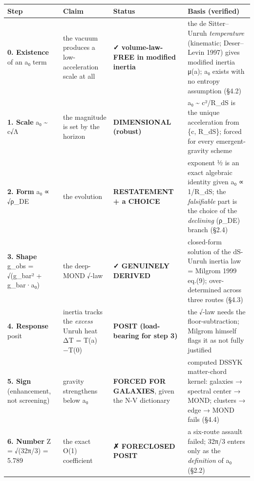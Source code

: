 \documentclass[
]{article}
\newcounter{none} %
\begin{document}
{\def\LTcaptype{none} %
\begin{longtable}[]{@{}
  >{\raggedright\arraybackslash}p{}
  >{\raggedright\arraybackslash}p{}
  >{\raggedright\arraybackslash}p{}
  >{\raggedright\arraybackslash}p{}@{}}
\toprule\noalign{}
\begin{minipage}[b]{\linewidth}\raggedright
Step
\end{minipage} & \begin{minipage}[b]{\linewidth}\raggedright
Claim
\end{minipage} & \begin{minipage}[b]{\linewidth}\raggedright
Status
\end{minipage} & \begin{minipage}[b]{\linewidth}\raggedright
Basis (verified)
\end{minipage} \\
\midrule\noalign{}
\endhead
\bottomrule\noalign{}
\endlastfoot
\textbf{0. Existence} of an a₀ term & the vacuum produces a
low-acceleration scale at all & \textbf{✓ volume-law-FREE in modified
inertia} & the de Sitter--Unruh \emph{temperature} (kinematic;
Deser--Levin 1997) gives modified inertia μ(a); a₀ exists with no
entropy assumption (§4.2) \\
\textbf{1. Scale} a₀ \textasciitilde{} c√Λ & the magnitude is set by the
horizon & \textbf{DIMENSIONAL (robust)} & a₀ \textasciitilde{} c²/R\_dS
is the unique acceleration from \{c, R\_dS\}; forced for every
emergent-gravity scheme \\
\textbf{2. Form} a₀ ∝ √ρ\_DE & the evolution & \textbf{RESTATEMENT + a
CHOICE} & exponent ½ is an exact algebraic identity given a₀ ∝ 1/R\_dS;
the \emph{falsifiable} part is the choice of the \emph{declining}
(ρ\_DE) branch (§2.4) \\
\textbf{3. Shape} g\_obs = √(g\_bar² + g\_bar·a₀) & the deep-MOND √-law
& \textbf{✓ GENUINELY DERIVED} & closed-form solution of the dS-Unruh
inertia law = Milgrom 1999 eq.(9); over-determined across three routes
(§4.3) \\
\textbf{4. Response} posit & inertia tracks the \emph{excess} Unruh heat
ΔT = T(a)−T(0) & \textbf{POSIT (load-bearing for step 3)} & the √-law
needs the floor-subtraction; Milgrom himself flags it as not fully
justified \\
\textbf{5. Sign} (enhancement, not screening) & gravity strengthens
below a₀ & \textbf{FORCED FOR GALAXIES}, given the N-V dictionary &
computed DSSYK matter-chord kernel: galaxies → spectral center → MOND;
clusters → edge → MOND fails (§4.4) \\
\textbf{6. Number} Z = √(32π/3) = 5.789 & the exact O(1) coefficient &
\textbf{✗ FORECLOSED POSIT} & a six-route assault failed; 32π/3 enters
only as the \emph{definition} of a₀ (§2.2) \\
\end{longtable}
}
\end{document}
